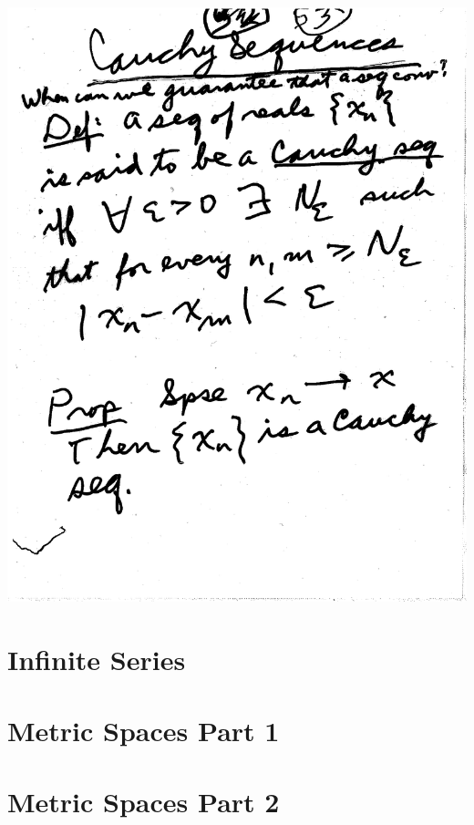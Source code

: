 \documentclass[10pt,a4paper]{article}
\begin{document}
\includegraphics[scale=.5]{Pages/LC_10}

\newpage
\section{Infinite Series}






\section{Metric Spaces Part 1}





\section{Metric Spaces Part 2}




\end{document}
